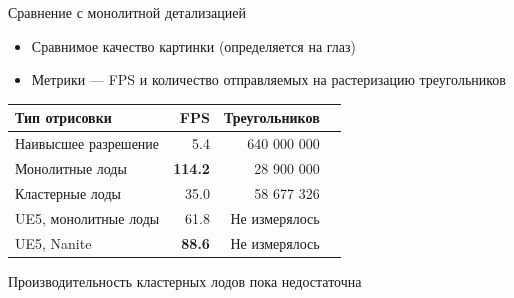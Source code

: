 \begin{frame}{Сравнение с монолитной детализацией}
    \begin{itemize}
        \item Сравнимое качество картинки (определяется на глаз)
        \item Метрики --- FPS и количество отправляемых на растеризацию треугольников
    \end{itemize}

    \begin{center}
        \begin{tabular}{lrrr}
            \hline \hline
            Тип отрисовки & FPS & Треугольников \\ \hline
            Наивысшее разрешение & 5.4 & 640 000 000 \\
            Монолитные лоды & \textbf{114.2} & 28 900 000 \\
            Кластерные лоды & 35.0 & 58 677 326 \\
            \hline
            UE5, монолитные лоды & 61.8 & Не измерялось \\
            UE5, Nanite & \textbf{88.6} & Не измерялось \\
            \hline \hline
        \end{tabular}
    \end{center}

    \alert{Производительность кластерных лодов пока недостаточна}
\end{frame}

